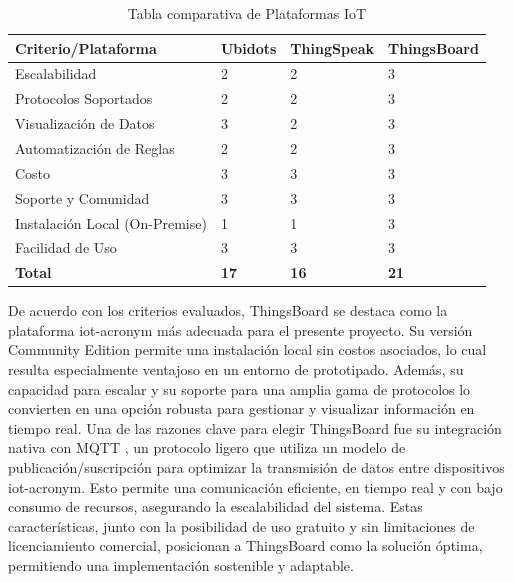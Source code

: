 \begin{table}[H]
\centering
\renewcommand{\arraystretch}{1.3} %
\caption{Tabla comparativa de Plataformas IoT}
\label{fig:Elec_tb}
\begin{tabularx}{\textwidth}{|p{4.4cm}|X|X|X|}
\hline
\textbf{Criterio/Plataforma}                & \textbf{Ubidots} & \textbf{ThingSpeak} & \textbf{ThingsBoard} \\ \hline
 Escalabilidad                           & 2                & 2                   & 3                    \\ \hline
 Protocolos Soportados                   & 2                & 2                   & 3                    \\ \hline
 Visualización de Datos                  & 3                & 2                   & 3                    \\ \hline
 Automatización de Reglas                & 2                & 2                   & 3                    \\ \hline
 Costo                                   & 3                & 3                   & 3                    \\ \hline
 Soporte y Comunidad                     & 3                & 3                   & 3                    \\ \hline
 Instalación Local (On-Premise)          & 1                & 1                   & 3                    \\ \hline
 Facilidad de Uso                        & 3                & 3                   & 3                    \\ \hline
\textbf{Total}                             & \textbf{17}      & \textbf{16}         & \textbf{21}          \\ \hline
\end{tabularx}
\end{table}


De acuerdo con los criterios evaluados, ThingsBoard se destaca como la plataforma \acrshort{iot-acronym} más adecuada para el presente proyecto. Su versión Community Edition permite una instalación local sin costos asociados, lo cual resulta especialmente ventajoso en un entorno de prototipado. Además, su capacidad para escalar y su soporte para una amplia gama de protocolos lo convierten en una opción robusta para gestionar y visualizar información en tiempo real. Una de las razones clave para elegir ThingsBoard fue su integración nativa con MQTT \cite{MQTT}, un protocolo ligero que utiliza un modelo de publicación/suscripción para optimizar la transmisión de datos entre dispositivos \acrshort{iot-acronym}. Esto permite una comunicación eficiente, en tiempo real y con bajo consumo de recursos, asegurando la escalabilidad del sistema. Estas características, junto con la posibilidad de uso gratuito y sin limitaciones de licenciamiento comercial, posicionan a ThingsBoard como la solución óptima, permitiendo una implementación sostenible y adaptable.








